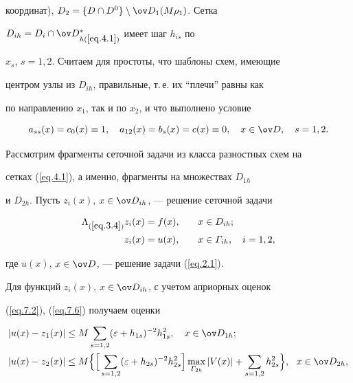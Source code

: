 координат), $D_2=\{D\cap D^0\}\setminus\od_1(M\rho_1)$. Сетка


$D_{ih}=D_i\cap\od{}^*_{h(\ref{eq.4.1})}$ имеет шаг $h_{is}$ по


$x_s$, $s=1,2$. Считаем для простоты, что шаблоны схем, имеющие


центром узлы из $D_{ih}$, правильные, т.\,е. их ``плечи'' равны как


по направлению $x_1$, так и по $x_2$, и что выполнено условие


$$


a_{ss}(x)=c_0(x)\equiv 1,\quad a_{12}(x)=b_s(x)=c(x)\equiv 0,


\quad x\in\od, \quad s=1,2.


$$





Рассмотрим фрагменты сеточной задачи из класса разностных схем на


сетках (\ref{eq.4.1}), а именно, фрагменты на множествах $D_{1h}$


и $D_{2h}$. Пусть $z_i(x)$, $x\in\od_{ih}$, --- решение сеточной задачи


\begin{alignat}{2} \label{eq.4.2}


\La_{(\ref{eq.3.4})} z_i(x)&=f(x), &\quad x&\in D_{ih}; \\


z_i(x)&=u(x), &\quad x&\in \varGamma_{ih},\quad i=1,2, \notag


\end{alignat}


где $u(x)$, $x\in\od$, --- решение задачи (\ref{eq.2.1}).





Для функций $z_i(x)$, $x\in\od_{ih}$, с учетом априорных оценок


(\ref{eq.7.2}), (\ref{eq.7.6}) получаем оценки


\begin{subequations} \label{eq.4.3}


\begin{align} \label{eq.4.3a}


|u(x)-z_1(x)|&\leq M\sum_{s=1,2}(\eps+h_{1s})^{-2}h_{1s}^2,


\quad x\in \od_{1h}; \\


\label{eq.4.3b}


|u(x)-z_2(x)|&\leq M\Big\{ \Big[\sum_{s=1,2}


(\eps+h_{2s})^{-2}h_{2s}^2\Big]\max_{\varGamma_{2h}}


|V(x)|+\sum_{s=1,2}h_{2s}^2\Big\}, \ \ x\in \od_{2h},


\end{align}


\end{subequations}


